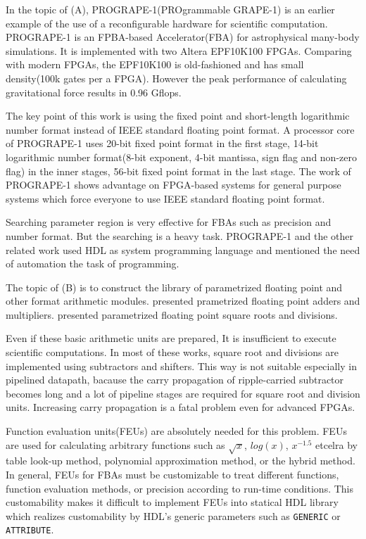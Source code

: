 \documentclass{llncs}
\begin{document}
In the topic of (A), PROGRAPE-1(PROgrammable GRAPE-1)\cite{HFKM00} is
an earlier example of the use of a reconfigurable hardware for
scientific computation.  PROGRAPE-1 is an FPBA-based Accelerator(FBA)
for astrophysical many-body simulations. It is implemented with two
Altera EPF10K100 FPGAs. Comparing with modern FPGAs, the EPF10K100 is
old-fashioned and has small density(100k gates per a FPGA). However the
peak performance of calculating gravitational force results in 0.96
Gflops. 

The key point of this work is using the fixed point and short-length
logarithmic number format instead of IEEE standard floating point
format. A processor core of PROGRAPE-1 uses 20-bit fixed point format
in the first stage, 14-bit logarithmic number format(8-bit exponent,
4-bit mantissa, sign flag and non-zero flag) in the inner stages,
56-bit fixed point format in the last stage.  The work of PROGRAPE-1
shows advantage on FPGA-based systems for general purpose systems
which force everyone to use IEEE standard floating point format.

Searching parameter region is very effective for FBAs such as
precision and number format. But the searching is a heavy
task. PROGRAPE-1 and the other related work\cite{LKM02}\cite{SS03}\cite{AKEDC04}
used HDL as system programming language and mentioned the need of
automation the task of programming.

The topic of (B) is to construct the library of parametrized floating
point and other format arithmetic modules.  \cite{JL01}\cite{LCCN03}
presented prametrized floating point adders and
multipliers. \cite{LKM02}\cite{WN04} presented parametrized floating
point square roots and divisions. 

Even if these basic arithmetic units are prepared, It is
insufficient to execute scientific computations.  In most of these
works, square root and divisions are implemented using subtractors and
shifters. This way is not suitable especially in pipelined datapath,
bacause the carry propagation of ripple-carried subtractor becomes long and
a lot of pipeline stages are required for square root and division units.
Increasing carry propagation is a fatal problem even for advanced FPGAs.

Function evaluation units(FEUs) are absolutely needed for this
problem.  FEUs are used for calculating arbitrary functions such as
$\sqrt{x}$, $log(x)$, $x^{-1.5}$ etcelra by table look-up method,
polynomial approximation method, or the hybrid
method\cite{FO01}\cite{M97}.  In general, FEUs for FBAs must be
customizable to treat different functions, function evaluation
methods, or precision according to run-time conditions.  This
customability makes it difficult to implement FEUs into statical HDL
library which realizes customability by HDL's
generic parameters such as \verb|GENERIC| or \verb|ATTRIBUTE|.
\end{document}
